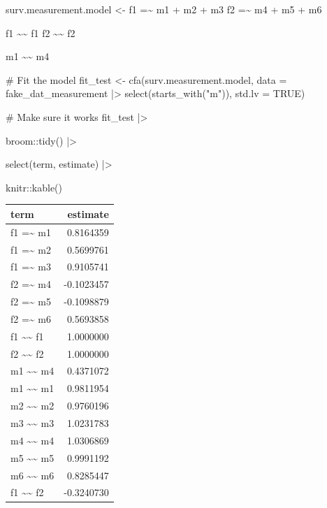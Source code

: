 \documentclass[
  letterpaper,
  DIV=11,
  numbers=noendperiod]{scrreprt}
\newenvironment{Shaded}{\begin{snugshade}}{\end{snugshade}}
\newcommand{\AttributeTok}[1]{\textcolor[rgb]{0.40,0.45,0.13}{#1}}
\newcommand{\CommentTok}[1]{\textcolor[rgb]{0.37,0.37,0.37}{#1}}
\newcommand{\ConstantTok}[1]{\textcolor[rgb]{0.56,0.35,0.01}{#1}}
\newcommand{\FunctionTok}[1]{\textcolor[rgb]{0.28,0.35,0.67}{#1}}
\newcommand{\NormalTok}[1]{\textcolor[rgb]{0.00,0.23,0.31}{#1}}
\newcommand{\OtherTok}[1]{\textcolor[rgb]{0.00,0.23,0.31}{#1}}
\newcommand{\SpecialCharTok}[1]{\textcolor[rgb]{0.37,0.37,0.37}{#1}}
\newcommand{\StringTok}[1]{\textcolor[rgb]{0.13,0.47,0.30}{#1}}
\begin{document}
\begin{Shaded}
\begin{Highlighting}[]
\NormalTok{surv.measurement.model }\OtherTok{\textless{}{-}} \StringTok{\textquotesingle{} }
\StringTok{  f1 =\textasciitilde{} m1 + m2 + m3}
\StringTok{  f2 =\textasciitilde{} m4 + m5 + m6}

\StringTok{  f1 \textasciitilde{}\textasciitilde{} f1}
\StringTok{  f2 \textasciitilde{}\textasciitilde{} f2}

\StringTok{  m1 \textasciitilde{}\textasciitilde{} m4}
\StringTok{\textquotesingle{}}

\CommentTok{\# Fit the model}
\NormalTok{fit\_test }\OtherTok{\textless{}{-}} \FunctionTok{cfa}\NormalTok{(surv.measurement.model, }\AttributeTok{data =}\NormalTok{ fake\_dat\_measurement }\SpecialCharTok{|\textgreater{}} \FunctionTok{select}\NormalTok{(}\FunctionTok{starts\_with}\NormalTok{(}\StringTok{"m"}\NormalTok{)), }\AttributeTok{std.lv =} \ConstantTok{TRUE}\NormalTok{)}

\CommentTok{\# Make sure it works}
\NormalTok{fit\_test }\SpecialCharTok{|\textgreater{}} 

\NormalTok{  broom}\SpecialCharTok{::}\FunctionTok{tidy}\NormalTok{() }\SpecialCharTok{|\textgreater{}}

  \FunctionTok{select}\NormalTok{(term, estimate) }\SpecialCharTok{|\textgreater{}}

\NormalTok{  knitr}\SpecialCharTok{::}\FunctionTok{kable}\NormalTok{()}
\end{Highlighting}
\end{Shaded}

\begin{longtable}[]{@{}lr@{}}
\toprule()
term & estimate \\
\midrule()
\endhead
f1 =\textasciitilde{} m1 & 0.8164359 \\
f1 =\textasciitilde{} m2 & 0.5699761 \\
f1 =\textasciitilde{} m3 & 0.9105741 \\
f2 =\textasciitilde{} m4 & -0.1023457 \\
f2 =\textasciitilde{} m5 & -0.1098879 \\
f2 =\textasciitilde{} m6 & 0.5693858 \\
f1 \textasciitilde\textasciitilde{} f1 & 1.0000000 \\
f2 \textasciitilde\textasciitilde{} f2 & 1.0000000 \\
m1 \textasciitilde\textasciitilde{} m4 & 0.4371072 \\
m1 \textasciitilde\textasciitilde{} m1 & 0.9811954 \\
m2 \textasciitilde\textasciitilde{} m2 & 0.9760196 \\
m3 \textasciitilde\textasciitilde{} m3 & 1.0231783 \\
m4 \textasciitilde\textasciitilde{} m4 & 1.0306869 \\
m5 \textasciitilde\textasciitilde{} m5 & 0.9991192 \\
m6 \textasciitilde\textasciitilde{} m6 & 0.8285447 \\
f1 \textasciitilde\textasciitilde{} f2 & -0.3240730 \\
\bottomrule()
\end{longtable}
\end{document}
